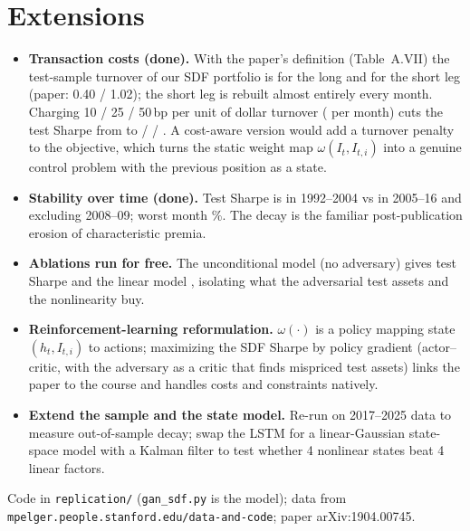 \documentclass[10pt]{article}
\begin{document}
\section{Extensions}
\begin{itemize}
\item \textbf{Transaction costs (done).} With the paper's definition (Table~A.VII) the test-sample turnover of our
SDF portfolio is \turnLong{} for the long and \turnShort{} for the short leg (paper: 0.40 / 1.02); the short leg is
rebuilt almost entirely every month. Charging 10 / 25 / 50\,bp per unit of dollar turnover (\turnDollar{} per month)
cuts the test Sharpe from \ganSRTe{} to \srNetTen{} / \srNetTwentyFive{} / \srNetFifty{}. A cost-aware version would add a turnover penalty to the objective, which turns
the static weight map $\omega(I_t,I_{t,i})$ into a genuine control problem with the previous position as a state.
\item \textbf{Stability over time (done).} Test Sharpe is \srEarly{} in 1992--2004 vs \srLate{} in 2005--16 and
\srExGFC{} excluding 2008--09; worst month \maxLoss\%. The decay is the familiar post-publication erosion of
characteristic premia.
\item \textbf{Ablations run for free.} The unconditional model (no adversary) gives test Sharpe \uncSRTe{} and the linear
model \lsSRTe{}, isolating what the adversarial test assets and the nonlinearity buy.
\item \textbf{Reinforcement-learning reformulation.} $\omega(\cdot)$ is a policy mapping state $(h_t,I_{t,i})$ to actions;
maximizing the SDF Sharpe by policy gradient (actor--critic, with the adversary as a critic that finds mispriced test
assets) links the paper to the course and handles costs and constraints natively.
\item \textbf{Extend the sample and the state model.} Re-run on 2017--2025 data to measure out-of-sample decay; swap the
LSTM for a linear-Gaussian state-space model with a Kalman filter to test whether 4 nonlinear states beat 4 linear factors.
\end{itemize}
{\small Code in \texttt{replication/} (\texttt{gan\_sdf.py} is the model); data from \texttt{mpelger.people.stanford.edu/data-and-code}; paper arXiv:1904.00745.}
\end{document}
